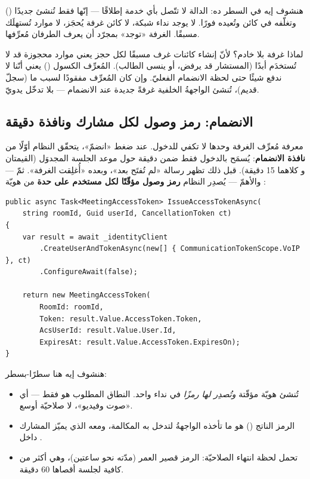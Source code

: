 هنشوف إيه في السطر ده: الدالة  لا تتّصل بأي خدمة إطلاقًا — إنّها
فقط تُنشئ  جديدًا () وتغلّفه في كائن 
وتُعيده فورًا. لا يوجد نداء شبكة، لا كائن غرفة يُحجَز، لا موارد تُستهلَك مسبقًا.
الغرفة «توجد» بمجرّد أن يعرف الطرفان مُعرِّفها.

\begin{why}
لماذا غرفة بلا خادم؟ لأنّ إنشاء كائنات غرف مسبقًا لكل حجز يعني موارد محجوزة قد لا
تُستخدَم أبدًا (المستشار قد يرفض، أو ينسى الطالب). المُعرِّف الكسول () يعني
أنّنا لا ندفع شيئًا حتى لحظة الانضمام الفعليّ. وإن كان المُعرِّف مفقودًا لسبب ما
(سجلّ قديم)، تُنشئ الواجهةُ الخلفية غرفةً جديدة عند الانضمام — بلا تدخّل يدويّ.
\end{why}

\subsection{الانضمام: رمز وصول لكل مشارك ونافذة  دقيقة}

معرفة مُعرِّف الغرفة وحدها لا تكفي للدخول. عند ضغط «انضمّ»، يتحقّق النظام أوّلًا من
\textbf{نافذة الانضمام}: يُسمَح بالدخول فقط ضمن  دقيقة حول موعد الجلسة
المجدوَل (القيمتان  و كلاهما 15 دقيقة).
قبل ذلك تظهر رسالة «لم تُفتَح بعد»، وبعده «أُغلِقت الغرفة». ثمّ — والأهمّ — يُصدِر
النظام \textbf{رمز وصول مؤقّتًا لكل مستخدم على حدة} من هويّة :

\begin{english}
\begin{lstlisting}[language={[Sharp]C}]
public async Task<MeetingAccessToken> IssueAccessTokenAsync(
    string roomId, Guid userId, CancellationToken ct)
{
    var result = await _identityClient
        .CreateUserAndTokenAsync(new[] { CommunicationTokenScope.VoIP }, ct)
        .ConfigureAwait(false);

    return new MeetingAccessToken(
        RoomId: roomId,
        Token: result.Value.AccessToken.Token,
        AcsUserId: result.Value.User.Id,
        ExpiresAt: result.Value.AccessToken.ExpiresOn);
}
\end{lstlisting}
\end{english}

هنشوف إيه هنا سطرًا-بسطر:
\begin{itemize}
\item {} تُنشئ هويّة  مؤقّتة \emph{وتُصدِر لها رمزًا}
  في نداء واحد. النطاق المطلوب هو  فقط — أي «صوت
  وفيديو»، لا صلاحيّة أوسع.
\item الرمز الناتج () هو ما تأخذه الواجهةُ لتدخل به المكالمة،
  ومعه  الذي يميّز المشارك داخل .
\item {} تحمل لحظة انتهاء الصلاحيّة: الرمز قصير العمر (مدّته نحو ساعتين)،
  وهي أكثر من كافية لجلسة أقصاها 60 دقيقة.
\end{itemize}

